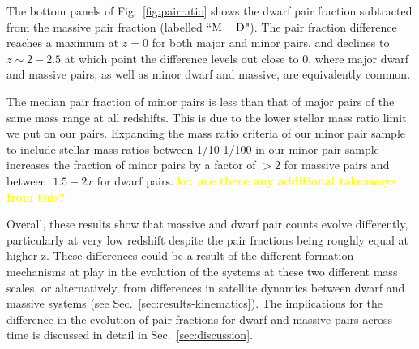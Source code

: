 \documentclass[twocolumn]{aastex631}
\newcommand{\kc}[1]{\textcolor{yellow}{\textbf{kc: #1}} }
\begin{document}
    The bottom panels of Fig.~\ref{fig:pairratio} shows the dwarf pair fraction subtracted from the massive pair fraction (labelled ``$\rm M-D$"). 
    The pair fraction difference reaches a maximum at $z=0$ for both major and minor pairs, and declines to $z\sim2-2.5$ at which point the difference levels out close to 0, where major dwarf and massive pairs, as well as minor dwarf and massive, are equivalently common. 
    
    The median pair fraction of minor pairs is less than that of major pairs of the same mass range at all redshifts. 
    This is due to the lower stellar mass ratio limit we put on our pairs. 
    Expanding the mass ratio criteria of our minor pair sample to include stellar mass ratios between 1/10-1/100 in our minor pair sample increases the fraction of minor pairs by a factor of $>2$ for massive pairs and between $~1.5-2x$ for dwarf pairs. \kc{are there any additional takeaways from this? }
    
    Overall, these results show that massive and dwarf pair counts evolve differently, particularly at very low redshift despite the pair fractions being roughly equal at higher z. 
    These differences could be a result of the different formation mechanisms at play in the evolution of the systems at these two different mass scales, or alternatively, from differences in satellite dynamics between dwarf and massive systems (see Sec.~\ref{sec:results-kinematics}). 
    The implications for the difference in the evolution of pair fractions for dwarf and massive pairs across time is discussed in detail in Sec.~\ref{sec:discussion}.
    
\end{document}
